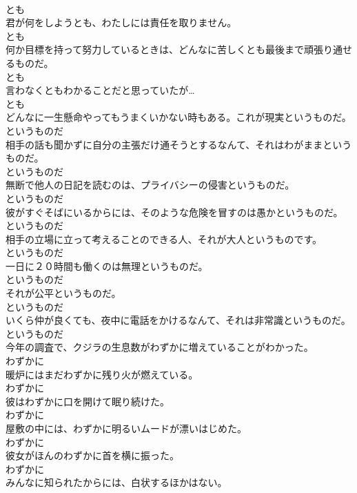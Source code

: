 \documentclass[8pt]{extreport}
\begin{document}
\begin{CJK}{UTF8}{min}
\\	とも	
\\	君が何をしようとも、わたしには責任を取りません。	
\\	とも	
\\	何か目標を持って努力しているときは、どんなに苦しくとも最後まで頑張り通せるものだ。	
\\	とも	
\\	言わなくともわかることだと思っていたが…	
\\	とも	
\\	どんなに一生懸命やってもうまくいかない時もある。これが現実というものだ。	
\\	というものだ	
\\	相手の話も聞かずに自分の主張だけ通そうとするなんて、それはわがままというものだ。	
\\	というものだ	
\\	無断で他人の日記を読むのは、プライバシーの侵害というものだ。	
\\	というものだ	
\\	彼がすぐそばにいるからには、そのような危険を冒すのは愚かというものだ。	
\\	というものだ	
\\	相手の立場に立って考えることのできる人、それが大人というものです。	
\\	というものだ	
\\	一日に２０時間も働くのは無理というものだ。	
\\	というものだ	
\\	それが公平というものだ。	
\\	というものだ	
\\	いくら仲が良くても、夜中に電話をかけるなんて、それは非常識というものだ。	
\\	というものだ	
\\	今年の調査で、クジラの生息数がわずかに増えていることがわかった。	
\\	わずかに	
\\	暖炉にはまだわずかに残り火が燃えている。	
\\	わずかに	
\\	彼はわずかに口を開けて眠り続けた。	
\\	わずかに	
\\	屋敷の中には、わずかに明るいムードが漂いはじめた。	
\\	わずかに	
\\	彼女がほんのわずかに首を横に振った。	
\\	わずかに	
\\	みんなに知られたからには、白状するほかはない。	

\end{CJK}
\end{document}
